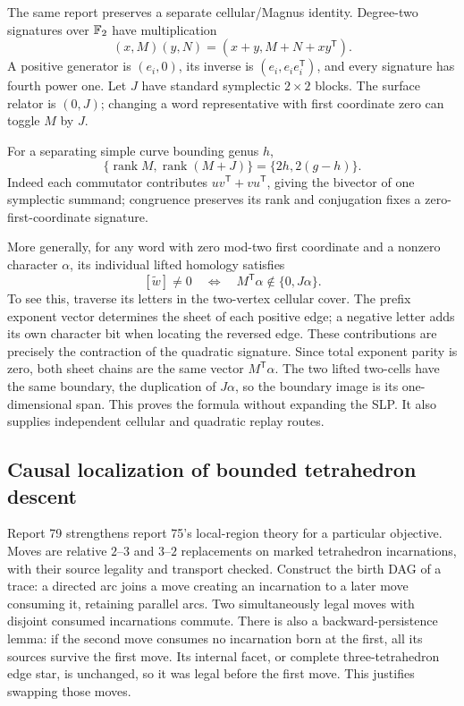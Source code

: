 The same report preserves a separate cellular/Magnus identity. Degree-two
signatures over $\mathbb{F}_2$ have multiplication
\[
 (x,M)(y,N)=(x+y,M+N+xy^{\mathsf T}).
\]
A positive generator is $(e_i,0)$, its inverse is
$(e_i,e_ie_i^{\mathsf T})$, and every signature has fourth power one.
Let $J$ have standard symplectic $2\times2$ blocks. The surface relator
is $(0,J)$; changing a word representative with first coordinate zero
can toggle $M$ by $J$.

For a separating simple curve bounding genus $h$,
\[
 \{\operatorname{rank}M,\operatorname{rank}(M+J)\}
       =\{2h,2(g-h)\}.
\]
Indeed each commutator contributes $uv^{\mathsf T}+vu^{\mathsf T}$,
giving the bivector of one symplectic summand; congruence preserves its
rank and conjugation fixes a zero-first-coordinate signature.

More generally, for any word with zero mod-two first coordinate and a
nonzero character $\alpha$, its individual lifted homology satisfies
\[
 [\widetilde w]\ne0\quad\Longleftrightarrow\quad
                M^{\mathsf T}\alpha\notin\{0,J\alpha\}.
\]
To see this, traverse its letters in the two-vertex cellular cover. The
prefix exponent vector determines the sheet of each positive edge; a
negative letter adds its own character bit when locating the reversed edge.
These contributions are precisely the contraction of the quadratic
signature. Since total exponent parity is zero, both sheet chains are the
same vector $M^{\mathsf T}\alpha$. The two lifted two-cells have the same
boundary, the duplication of $J\alpha$, so the boundary image is its
one-dimensional span. This proves the formula without expanding the SLP.
It also supplies independent cellular and quadratic replay routes.

\subsection{Causal localization of bounded tetrahedron descent}

Report 79 strengthens report 75's local-region theory for a particular
objective. Moves are relative $2$--$3$ and $3$--$2$ replacements on marked
tetrahedron incarnations, with their source legality and transport checked.
Construct the birth DAG of a trace: a directed arc joins a move creating an
incarnation to a later move consuming it, retaining parallel arcs.
Two simultaneously legal moves with disjoint consumed incarnations commute.
There is also a backward-persistence lemma: if the second move consumes no
incarnation born at the first, all its sources survive the first move.
Its internal facet, or complete three-tetrahedron edge star, is unchanged,
so it was legal before the first move. This justifies swapping those moves.

